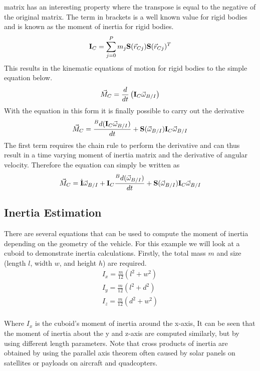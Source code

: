 \documentclass{article}
\begin{document}
matrix has an interesting property where the transpose is equal to the
negative of the original matrix. The term in brackets is a well known
value for rigid bodies and is known as the moment of inertia for rigid
bodies. 
\begin{equation}
{\bf I}_C =  \sum\limits_{j=0}^P m_j{\bf S}(\vec{r}_{Cj}){\bf
  S}(\vec{r}_{Cj})^T
\end{equation}
This results in the kinematic equations of motion for rigid bodies to
the simple equation below.
\begin{equation}
\vec{M}_C =  \frac{d}{dt}\left({\bf I}_C\vec{\omega}_{B/I} \right)
\end{equation}
With the equation in this form it is finally possible to carry out the
derivative
\begin{equation}
\vec{M}_C = \frac{{}^Bd ({\bf I}_C\vec{\omega}_{B/I})}{dt} + {\bf
  S}(\vec{\omega}_{B/I}){\bf I}_C\vec{\omega}_{B/I}
\end{equation}
The first term requires the chain rule to perform the derivative and
can thus result in a time varying moment of inertia matrix and the
derivative of angular velocity. Therefore the equation can simply be written as
\begin{equation}
\vec{M}_C = \dot{{\bf I}}\vec{\omega}_{B/I} + {\bf I}_C\frac{{}^Bd (\vec{\omega}_{B/I})}{dt} + {\bf
  S}(\vec{\omega}_{B/I}){\bf I}_C\vec{\omega}_{B/I}
\end{equation}

\subsection{Inertia Estimation}

There are several equations that can be used to compute the moment of
inertia depending on the geometry of the vehicle. For this example
we will look at a cuboid to demonstrate inertia
calculations. Firstly, the total mass $m$ and size (length $l$,
width $w$, and height $h$) are required. 
\begin{equation}
  \begin{matrix}
    I_x = \frac{m}{12}(l^2 + w^2) \\
    I_y = \frac{m}{12}(l^2 + d^2) \\
    I_z = \frac{m}{12}(d^2 + w^2) \\
  \end{matrix}
\end{equation}

Where $I_x$ is the cuboid’s moment of inertia around the x-axis, It
can be seen that the moment of inertia about the y and z-axis are
computed similarly, but by using different length parameters. Note
that cross products of inertia are obtained by using the parallel axis
theorem often caused by solar panels on satellites or payloads on
aircraft and quadcopters.
\end{document}
